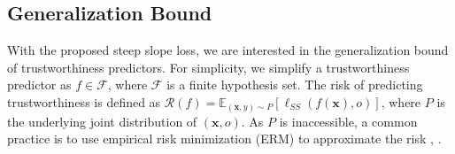 

\subsection{Generalization Bound}
With the proposed steep slope loss, we are interested in the generalization bound of trustworthiness predictors.
For simplicity, we simplify a trustworthiness predictor as $f\in \mathcal{F}$, where $\mathcal{F}$ is a finite hypothesis set.
The risk of predicting trustworthiness is defined as {\small $\mathcal{R}(f)=\mathbb{E}_{(\bm{x},y)\sim P} [\ell_{SS}(f(\bm{x}), o)]$}, where $P$ is the underlying joint distribution of $(\bm{x}, o)$. As $P$ is inaccessible, a common practice is to use empirical risk minimization (ERM) to approximate the risk \cite{Vapnik_TNN_1999}, .

